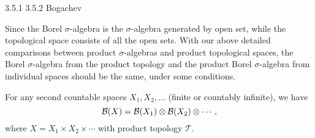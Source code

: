 3.5.1 3.5.2 Bogachev

Since the Borel $\sigma$-algebra is the $\sigma$-algebra generated by open set, while the topological space consists of all the open sets. With our above detailed comparisons between product $\sigma$-algebras and product topological spaces, the Borel $\sigma$-algebra from the product topology and the product Borel $\sigma$-algebra from individual spaces should be the same, under some conditions.

\begin{thm} \label{thm:Borel-prod-sigma-prod-top}
    For any second countable spaces $X_1,X_2,\dotsc$ (finite or countably infinite), we have \begin{equation} \label{eq:borel-prod-agreement}
        \B(X) = \B(X_1) \otimes \B(X_2) \otimes \dotsb,
    \end{equation} where $X = X_1 \times X_2 \times \dotsb$ with product topology $\mathcal{T}$.
\end{thm}
